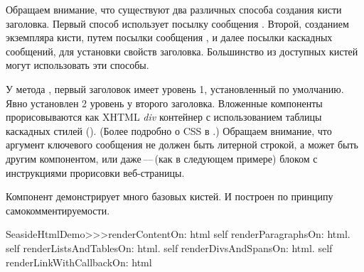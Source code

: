 \documentclass[a4paper,10pt,twoside]{book}
\begin{document}
Обращаем внимание,
что существуют два различных способа создания кисти заголовка.
Первый способ использует посылку сообщения .
Второй, созданием экземпляра кисти, путем посылки сообщения ,
и далее посылки каскадных сообщений, для установки свойств заголовка.
Большинство из доступных кистей могут использовать эти способы.





У метода , первый заголовок имеет уровень 1,
установленный по умолчанию.
Явно установлен 2 уровень у второго заголовка.
Вложенные компоненты прорисовываются как XHTML \emph{div} контейнер
с использованием таблицы каскадных стилей ().
(Более подробно о CSS в .)
Обращаем внимание, что аргумент ключевого сообщения 
не должен быть литерной строкой, а может быть другим компонентом,
или даже\,---\,(как в следующем примере) блоком с инструкциями
прорисовки веб-страницы.


Компонент  демонстрирует много базовых кистей.
И построен по принципу самокомментируемости.

\begin{code}{}
SeasideHtmlDemo>>>renderContentOn: html 
	self renderParagraphsOn: html.
	self renderListsAndTablesOn: html.
	self renderDivsAndSpansOn: html.
	self renderLinkWithCallbackOn: html
\end{code}
\end{document}
